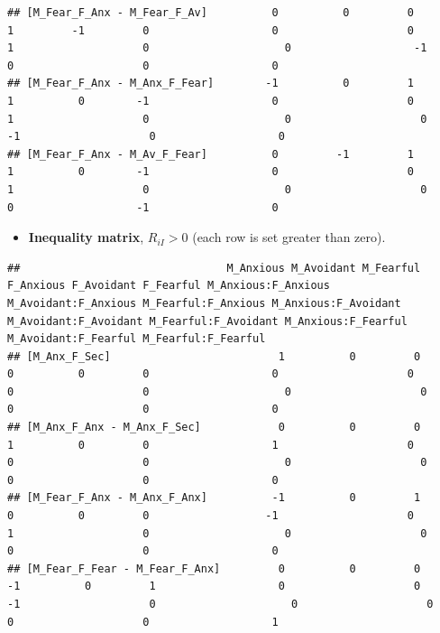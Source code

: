 \documentclass[
]{book}
\providecommand{\tightlist}{%
  \setlength{\itemsep}{0pt}\setlength{\parskip}{0pt}}
\begin{document}
\begin{verbatim}
## [M_Fear_F_Anx - M_Fear_F_Av]          0          0         0         1         -1         0                   0                    0                   1                    0                     0                   -1                   0                    0                   0
## [M_Fear_F_Anx - M_Anx_F_Fear]        -1          0         1         1          0        -1                   0                    0                   1                    0                     0                    0                  -1                    0                   0
## [M_Fear_F_Anx - M_Av_F_Fear]          0         -1         1         1          0        -1                   0                    0                   1                    0                     0                    0                   0                   -1                   0
\end{verbatim}

\begin{itemize}
\tightlist
\item
  \textbf{Inequality matrix}, \(R_{iI} > 0\) (each row is set greater than zero).
\end{itemize}

\begin{verbatim}
##                                M_Anxious M_Avoidant M_Fearful F_Anxious F_Avoidant F_Fearful M_Anxious:F_Anxious M_Avoidant:F_Anxious M_Fearful:F_Anxious M_Anxious:F_Avoidant M_Avoidant:F_Avoidant M_Fearful:F_Avoidant M_Anxious:F_Fearful M_Avoidant:F_Fearful M_Fearful:F_Fearful
## [M_Anx_F_Sec]                          1          0         0         0          0         0                   0                    0                   0                    0                     0                    0                   0                    0                   0
## [M_Anx_F_Anx - M_Anx_F_Sec]            0          0         0         1          0         0                   1                    0                   0                    0                     0                    0                   0                    0                   0
## [M_Fear_F_Anx - M_Anx_F_Anx]          -1          0         1         0          0         0                  -1                    0                   1                    0                     0                    0                   0                    0                   0
## [M_Fear_F_Fear - M_Fear_F_Anx]         0          0         0        -1          0         1                   0                    0                  -1                    0                     0                    0                   0                    0                   1
\end{verbatim}
\end{document}
